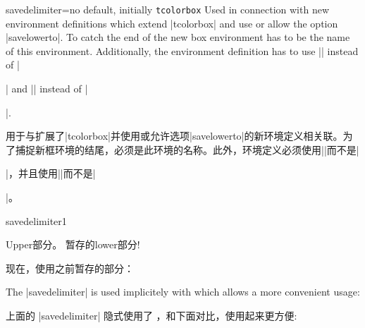 \begin{docTcbKey}{savedelimiter}{=}{no default, initially \texttt{tcolorbox}}
Used in connection with new environment definitions which extend
|tcolorbox| and use or allow the option |savelowerto|.
To catch the end of the new box environment  has to be the name of
this environment. Additionally, the environment definition has to use
|\tcolorbox| instead of
|\begin{tcolorbox}| and |\endtcolorbox| instead of |\end{tcolorbox}|.


用于与扩展了|tcolorbox|并使用或允许选项|savelowerto|的新环境定义相关联。为了捕捉新框环境的结尾，必须是此环境的名称。此外，环境定义必须使用|\tcolorbox|而不是|\begin{tcolorbox}|，并且使用|\endtcolorbox|而不是|\end{tcolorbox}|。

\begin{exdispExample}{savedelimiter1}
\newenvironment{mybox}[1]{%
\tcolorbox[savedelimiter=mybox,
            savelowerto=\jobname_bspsave2.tex,lowerbox=ignored,
            colback=red!5!white,colframe=red!75!black,fonttitle=\bfseries,
            title={#1}]}%
{\endtcolorbox}

\begin{mybox}{暂存 savelowerto 的内容的新环境}
Upper部分。
\tcblower
暂存的lower部分!
\end{mybox}

现在，使用之前暂存的部分：
\begin{tcolorbox}[colback=green!5,title=用到 savelowerto 暂存的内容]

\end{tcolorbox}
\end{exdispExample}

\enlargethispage*{1cm}

The |savedelimiter| is used implicitely with  which
allows a more convenient usage:

上面的 |savedelimiter| 隐式使用了 ，和下面对比，使用起来更方便:
\end{docTcbKey}
